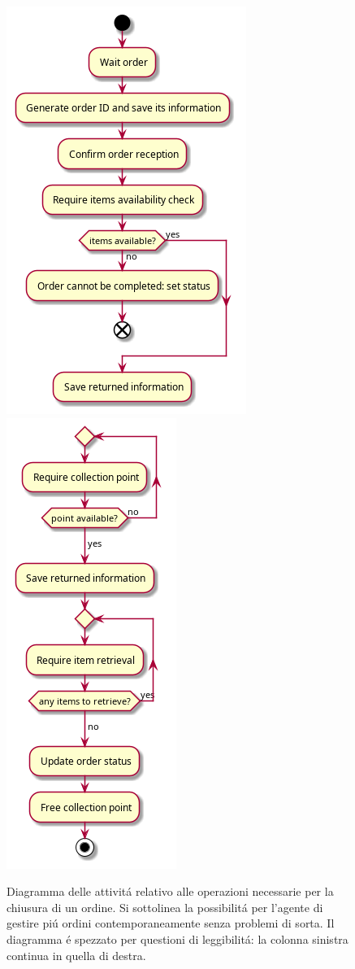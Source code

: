 \begin{figure}[!ht]\centering
    \includegraphics[width=.45\textwidth]{section/design/figure/order_manager/activity_diagram-1.png}
    \includegraphics[width=.45\textwidth]{section/design/figure/order_manager/activity_diagram-2.png}
    \caption{Diagramma delle attivit\'a relativo alle operazioni necessarie per la chiusura di un ordine. Si sottolinea la possibilit\'a per l'agente di gestire pi\'u ordini contemporaneamente senza problemi di sorta. Il diagramma \'e spezzato per questioni di leggibilit\'a: la colonna sinistra continua in quella di destra.}
    \label{fig:order-managet-activity-diagram}
\end{figure}

